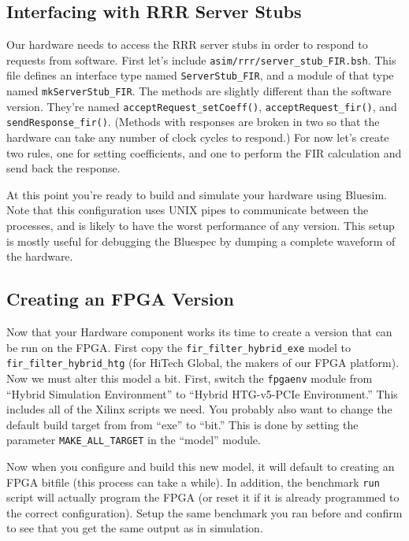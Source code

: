 \documentclass{article}
\begin{document}
\subsection{Interfacing with RRR Server Stubs}

Our hardware needs to access the RRR server stubs in order to respond to requests from software. First let's include
\texttt{asim/rrr/server\_stub\_FIR.bsh}. This file defines an interface type named \texttt{ServerStub\_FIR}, and a module of that
type named \texttt{mkServerStub\_FIR}. The methods are slightly different than the software version. They're named
\texttt{acceptRequest\_setCoeff()}, \texttt{acceptRequest\_fir()}, and \texttt{sendResponse\_fir()}. (Methods with responses are
broken in two so that the hardware can take any number of clock cycles to respond.) For now let's create two rules, one for setting
coefficients, and one to perform the FIR calculation and send back the response.

At this point you're ready to build and simulate your hardware using Bluesim. Note that this configuration uses UNIX pipes to
communicate between the processes, and is likely to have the worst performance of any version. This setup is mostly useful for
debugging the Bluespec by dumping a complete waveform of the hardware.

\subsection{Creating an FPGA Version}


Now that your Hardware component works its time to create a version that can be run on the FPGA. First copy the
\texttt{fir\_filter\_hybrid\_exe} model to \texttt{fir\_filter\_hybrid\_htg} (for HiTech Global, the makers of our FPGA platform).
Now we must alter this model a bit. First, switch the \texttt{fpgaenv} module from ``Hybrid Simulation Environment'' to ``Hybrid
HTG-v5-PCIe Environment.'' This includes all of the Xilinx scripts we need. You probably also want to change the default build
target from from ``exe'' to ``bit.'' This is done by setting the parameter \texttt{MAKE\_ALL\_TARGET} in the ``model'' module.

Now when you configure and build this new model, it will default to creating an FPGA bitfile (this process can take a while). In addition, the benchmark
\texttt{run} script will actually program the FPGA (or reset it if it is already programmed to the correct configuration). Setup the same benchmark you ran before
and confirm to see that you get the same output as in simulation.
\end{document}
